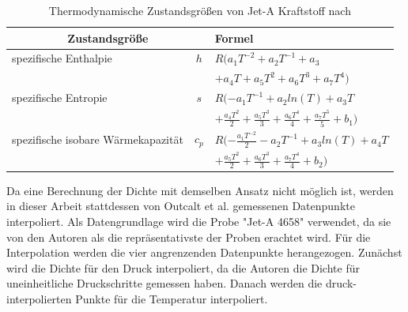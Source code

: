 \begin{table}[ht]
	\centering
	\caption{Thermodynamische Zustandsgrößen von Jet-A Kraftstoff nach 
		\cite{McBridge.2002}}
	\begin{tabular} {|l|c|l|} \hline%
		\multicolumn{2}{|c|}{Zustandsgröße}  & Formel\\ \hline\hline%
		spezifische Enthalpie &$h$ & $R(a_1T^{-2}+a_2T^{-1} +a_3$ \\ 
		& & $+a_4T+a_5T^2+a_6T^3+a_7T^4)$\\ \hline
		spezifische Entropie& $s$ &  $R(-a_1T^{-1}+a_2ln(T)+a_3T$\\ 
		& & $+\frac{a_4T^2}{2}+\frac{a_5T^3}{3}+\frac{a_6T^4}{4}+\frac{a_7T^5}{5}+b_1)$\\ \hline
		spezifische isobare Wärmekapazität &$c_p$ &  $R(-\frac{a_1T^{-2}}{2}-a_2T^{-1}+a_3ln(T)+ a_4T$\\ 
		& & $+\frac{a_5T^{2}}{2}+\frac{a_6T^{3}}{3}+\frac{a_7T^{4}}{4}+b_2)$\\ \hline
	\end{tabular}	
	\label{Tab:thermodynamic_properties_jeta}%
\end{table}
\FloatBarrier 

Da eine Berechnung der Dichte mit demselben Ansatz nicht möglich ist, werden in dieser Arbeit stattdessen von Outcalt et al. \cite{Outcalt.2009} gemessenen Datenpunkte interpoliert. Als Datengrundlage wird die Probe "Jet-A 4658" verwendet, da sie von den Autoren als die repräsentativste der Proben erachtet wird. Für die Interpolation werden die vier angrenzenden Datenpunkte herangezogen. Zunächst wird die Dichte für den Druck interpoliert, da die Autoren die Dichte für uneinheitliche Druckschritte gemessen haben. Danach werden die druck-interpolierten Punkte für die Temperatur interpoliert. 



